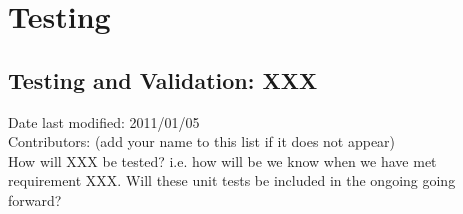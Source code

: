 \documentclass[11pt]{report}
\begin{document}
\chapter{Testing}

\section{Testing and Validation: XXX}
Date last modified: 2011/01/05 \\
Contributors: (add your name to this list if it does not appear) \\

How will XXX be tested? i.e. how will be we know when we have met requirement XXX. Will these unit tests be included in the ongoing going forward?


\end{document}
